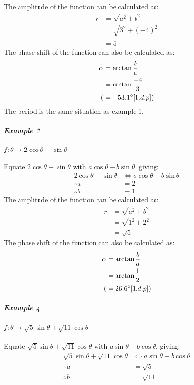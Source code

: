 \documentclass{article}
\begin{document}
		The amplitude of the function can be calculated as:
		\begin{align*}
		r &= \sqrt{a^2 + b^2} \\
		&= \sqrt{3^2 + (-4)^2} \\
		&= 5
		\end{align*}
		The phase shift of the function can also be calculated as:
		\begin{align*}
		\alpha &= \arctan{\frac{b}{a}} \\
		&= \arctan{\frac{-4}{3}} \\
		(&= -53.1\degree [1.d.p]) 
		\end{align*}
        The period is the same situation as example 1. \\
        \subparagraph{Example 3} $f:\theta \mapsto 2\cos{\theta} - \sin{\theta}$ \\\\
        Equate $2\cos{\theta} - \sin{\theta}$ with $a\cos{\theta} - b\sin{\theta}$, giving:
        \begin{align*}
        2\cos{\theta} - \sin{\theta} &\Leftrightarrow a\cos{\theta} - b\sin{\theta} \\
        \therefore a &= 2 \\
        \therefore b &= 1
        \end{align*}
        The amplitude of the function can be calculated as:
        \begin{align*}
        r &= \sqrt{a^2 + b^2} \\
        &= \sqrt{1^2 + 2^2} \\
        &= \sqrt{5}
        \end{align*}
        The phase shift of the function can also be calculated as:
        \begin{align*}
        \alpha &= \arctan{\frac{b}{a}} \\
        &= \arctan{\frac{1}{2}} \\
        (&= 26.6\degree [1.d.p]) 
        \end{align*}
        \subparagraph{Example 4} $f:\theta \mapsto \sqrt{5}\sin{\theta} + \sqrt{11}\cos{\theta}$ \\\\
        Equate $\sqrt{5}\sin{\theta} + \sqrt{11}\cos{\theta}$ with $a\sin{\theta} + b\cos{\theta}$, giving:
        \begin{align*}
        \sqrt{5}\sin{\theta} + \sqrt{11}\cos{\theta} &\Leftrightarrow a\sin{\theta} + b\cos{\theta} \\
        \therefore a &= \sqrt{5} \\
        \therefore b &= \sqrt{11}
        \end{align*}
\end{document}
